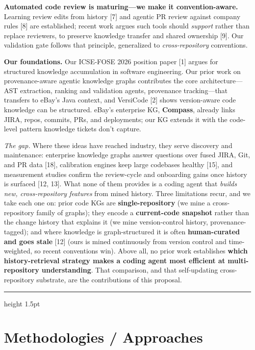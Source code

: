 \documentclass[11pt, letterpaper]{article}
\newcommand{\ehr}{{\color{gray!60}\hrule height 1.5pt}}
\begin{document}
\textbf{Automated code review is maturing---we make it convention-aware.} Learning review edits from history [7] and agentic PR review against company rules [8] are established; recent work argues such tools should \emph{support} rather than replace reviewers, to preserve knowledge transfer and shared ownership [9]. Our validation gate follows that principle, generalized to \emph{cross-repository} conventions.

\textbf{Our foundations.} Our ICSE-FOSE 2026 position paper [1] argues for structured knowledge accumulation in software engineering. Our prior work on provenance-aware agentic knowledge graphs contributes the core architecture---AST extraction, ranking and validation agents, provenance tracking---that transfers to eBay's Java context, and VersiCode [2] shows version-aware code knowledge can be structured. eBay's enterprise KG, \textbf{Compass}, already links JIRA, repos, commits, PRs, and deployments; our KG extends it with the code-level pattern knowledge tickets don't capture.

\emph{The gap.} Where these ideas have reached industry, they serve discovery and maintenance: enterprise knowledge graphs answer questions over fused JIRA, Git, and PR data [18], calibration engines keep large codebases healthy [15], and measurement studies confirm the review-cycle and onboarding gains once history is surfaced [12, 13]. What none of them provides is a coding agent that \emph{builds new, cross-repository features} from mined history. Three limitations recur, and we take each one on: prior code KGs are \textbf{single-repository} (we mine a cross-repository family of graphs); they encode a \textbf{current-code snapshot} rather than the change history that explains it (we mine version-control history, provenance-tagged); and where knowledge is graph-structured it is often \textbf{human-curated and goes stale} [12] (ours is mined continuously from version control and time-weighted, so recent conventions win). Above all, no prior work establishes \textbf{which history-retrieval strategy makes a coding agent most efficient at multi-repository understanding}. That comparison, and that self-updating cross-repository substrate, are the contributions of this proposal.

\ehr

\section*{Methodologies / Approaches}
\label{sec:method}
\end{document}
